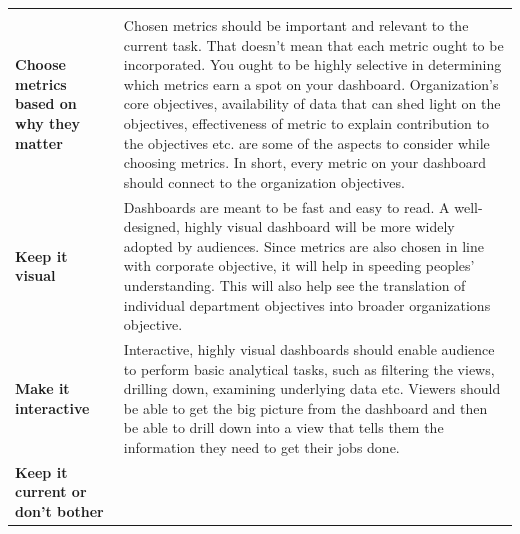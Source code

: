 \documentclass[]{book}
\begin{document}
\begin{longtable}[]{@{}ll@{}}
\begin{minipage}[t]{0.77\columnwidth}
\end{minipage}\tabularnewline
\begin{minipage}[t]{0.17\columnwidth}\raggedright
\textbf{Choose metrics based on why they matter}\strut
\end{minipage} & \begin{minipage}[t]{0.77\columnwidth}\raggedright
Chosen metrics should be important and relevant to the current task. That doesn't mean that each metric ought to be incorporated. You ought to be highly selective in determining which metrics earn a spot on your dashboard. Organization's core objectives, availability of data that can shed light on the objectives, effectiveness of metric to explain contribution to the objectives etc. are some of the aspects to consider while choosing metrics. In short, every metric on your dashboard should connect to the organization objectives.\strut
\end{minipage}\tabularnewline
\begin{minipage}[t]{0.17\columnwidth}\raggedright
\textbf{Keep it visual}\strut
\end{minipage} & \begin{minipage}[t]{0.77\columnwidth}\raggedright
Dashboards are meant to be fast and easy to read. A well-designed, highly visual dashboard will be more widely adopted by audiences. Since metrics are also chosen in line with corporate objective, it will help in speeding peoples' understanding. This will also help see the translation of individual department objectives into broader organizations objective.\strut
\end{minipage}\tabularnewline
\begin{minipage}[t]{0.17\columnwidth}\raggedright
\textbf{Make it interactive}\strut
\end{minipage} & \begin{minipage}[t]{0.77\columnwidth}\raggedright
Interactive, highly visual dashboards should enable audience to perform basic analytical tasks, such as filtering the views, drilling down, examining underlying data etc. Viewers should be able to get the big picture from the dashboard and then be able to drill down into a view that tells them the information they need to get their jobs done.\strut
\end{minipage}\tabularnewline
\begin{minipage}[t]{0.17\columnwidth}\raggedright
\textbf{Keep it current or don't bother}\strut
\end{minipage} & \begin{minipage}[t]{0.77\columnwidth}\raggedright

\end{minipage}
\end{longtable}
\end{document}
